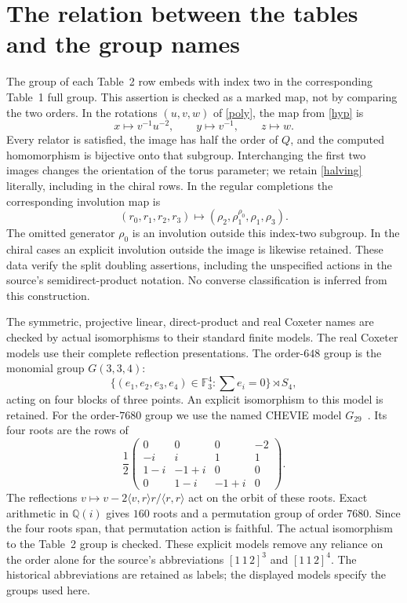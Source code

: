 \documentclass[11pt,a4paper]{article}
\begin{document}
\section{The relation between the tables and the group names}
The group of each Table~2 row embeds with index two in the corresponding
Table~1 full group. This assertion is checked as a marked map, not by
comparing the two orders. In the rotations $(u,v,w)$ of \eqref{poly},
the map from \eqref{hyp} is
\begin{equation}\label{halving}
 x\longmapsto v^{-1}u^{-2},\qquad
 y\longmapsto v^{-1},\qquad z\longmapsto w.
\end{equation}
Every relator is satisfied, the image has half the order of $Q$, and
the computed homomorphism is bijective onto that subgroup. Interchanging
the first two images changes the orientation of the torus parameter;
we retain \eqref{halving} literally, including in the chiral rows.
In the regular completions the corresponding involution map is
\[
 (r_0,r_1,r_2,r_3)\longmapsto
 (\rho_2,\rho_1^{\rho_0},\rho_1,\rho_3).
\]
The omitted generator $\rho_0$ is an involution outside this index-two
subgroup. In the chiral cases an explicit involution outside the image
is likewise retained. These data verify the split doubling assertions,
including the unspecified actions in the source's semidirect-product
notation. No converse classification is inferred from this construction.

The symmetric, projective linear, direct-product and real Coxeter names
are checked by actual isomorphisms to their standard finite models.
The real Coxeter models use their complete reflection presentations.
The order-$648$ group is the monomial group $G(3,3,4)$:
\[
 \{(e_1,e_2,e_3,e_4)\in\mathbb F_3^4:\sum e_i=0\}\rtimes S_4,
\]
acting on four blocks of three points. An explicit isomorphism to this
model is retained. For the order-$7680$ group we use the named CHEVIE
model $G_{29}$~\cite{chevie}. Its four roots are the rows of
\[
 \frac12\begin{pmatrix}
 0&0&0&-2\\-i&i&1&1\\1-i&-1+i&0&0\\0&1-i&-1+i&0
 \end{pmatrix}.
\]
The reflections $v\mapsto v-2\langle v,r\rangle r/\langle r,r\rangle$
act on the orbit of these roots. Exact arithmetic in $\mathbb Q(i)$
gives $160$ roots and a permutation group of order $7680$. Since the
four roots span, that permutation action is faithful. The actual
isomorphism to the Table~2 group is checked. These explicit models remove
any reliance on the order alone for the source's abbreviations
$[1\,1\,2]^3$ and $[1\,1\,2]^4$. The historical abbreviations are retained
as labels; the displayed models specify the groups used here.
\end{document}
